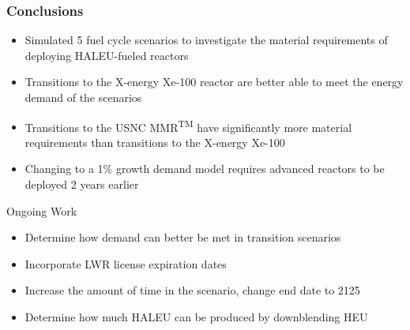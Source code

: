 \begin{frame}
    \frametitle{Conclusions}
    \begin{itemize}
        \item Simulated 5 fuel cycle scenarios to investigate the material 
              requirements of deploying \gls{HALEU}-fueled reactors
        \item Transitions to the X-energy Xe-100 reactor are better able to meet 
              the energy demand of the scenarios
        \item Transitions to the \gls{USNC} \gls{MMR}\textsuperscript{TM}
              have significantly more material requirements than transitions to 
              the X-energy Xe-100
        \item Changing to a 1\% growth demand model requires 
              advanced reactors to be deployed 2 years earlier
    \end{itemize}
    \begin{block}{Ongoing Work}
        \begin{itemize}
            \item Determine how demand can better be met in transition scenarios
            \item Incorporate \gls{LWR} license expiration dates
            \item Increase the amount of time in the scenario, change end date to 2125
            \item Determine how much \gls{HALEU} can be produced by downblending \gls{HEU}
        \end{itemize}
    \end{block}
\end{frame}
